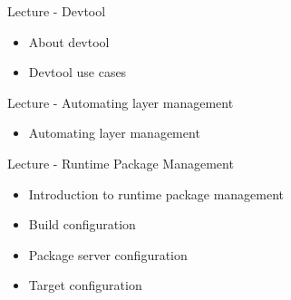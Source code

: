 \documentclass[a4paper,12pt,obeyspaces,spaces,hyphens]{article}
\begin{document}
\feagendaonecolumn
{Lecture - Devtool}
{
  \begin{itemize}
  \item About devtool
  \item Devtool use cases
  \end{itemize}
}

\feagendatwocolumn
{Lecture - Automating layer management}
{
  \begin{itemize}
  \item Automating layer management
  \end{itemize}
}
{Lecture - Runtime Package Management}
{
  \begin{itemize}
  \item Introduction to runtime package management
  \item Build configuration
  \item Package server configuration
  \item Target configuration
  \end{itemize}
}
\end{document}
